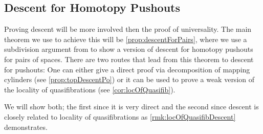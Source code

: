 \subsection*{Descent for Homotopy Pushouts}
Proving descent will be more involved then the proof of universality.
The main theorem we use to achieve this will be \cref{prop:descentForPairs}, where we use a subdivision argument from \cite{may1990weak} to show a version of descent for homotopy pushouts for pairs of spaces. %
There are two routes that lead from this theorem to descent for pushouts:
One can either give a direct proof via decomposition of mapping cylinders (see \cref{prop:topDescentPo}) or it can be used to prove a weak version of the locality of quasifibrations (see \cref{cor:locOfQuasifib}).

We will show both; 
the first since it is very direct and the second since descent is closely related to locality of quasifibrations as \cref{rmk:locOfQuasifibDescent} demonstrates.


